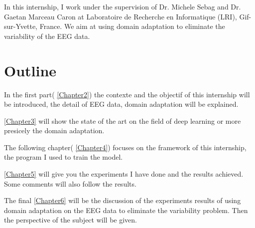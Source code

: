 In this internship, I work under the supervision of Dr. Michele Sebag and Dr. Gaetan Marceau Caron at Laboratoire de Recherche en Informatique (LRI), Gif-sur-Yvette, France. We aim at using domain adaptation to eliminate the variability of the EEG data. 


\section{Outline}
In the first part( \autoref{Chapter2}) the contexte and the objectif of this internship will be introduced, the detail of EEG data, domain adaptation will be explained.

\autoref{Chapter3} will show the state of the art on the field of deep learning or more presicely the domain adaptation.

The following chapter( \autoref{Chapter4}) focuses on the framework of this internship, the program I used to train the model.

\autoref{Chapter5} will give you the experiments I have done and the results achieved. Some comments will also follow the results.

The final \autoref{Chapter6} will be the discussion of the experiments results of using domain adaptation on the EEG data to eliminate the variability problem. Then the perspective of the subject will be given.